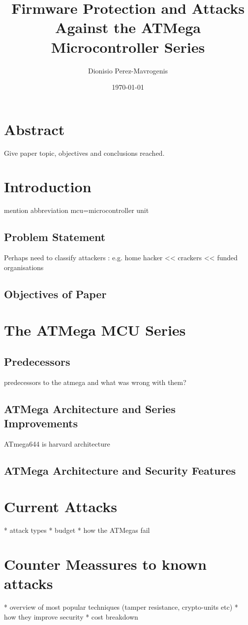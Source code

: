 \documentclass[12pt,a4paper,twocolumn]{article}
\author{Dionisio Perez-Mavrogenis}
\title{Firmware Protection and Attacks Against the ATMega Microcontroller Series}
\date{\today}
\begin{document}
	\maketitle
	
	\section*{Abstract}
	Give paper topic, objectives and conclusions reached.
	
	\section{Introduction}
	mention abbreviation mcu=microcontroller unit
	\subsection{Problem Statement}
	Perhaps need to classify attackers : e.g. home hacker << crackers << funded organisations 

	\subsection{Objectives of Paper}
	
	\section{The ATMega MCU Series}
	\subsection{Predecessors}
	predecessors to the atmega and what was wrong with them?
	\subsection{ATMega Architecture and Series Improvements}
	ATmega644 is harvard architecture \cite{atmega644_manual}
	
	\subsection{ATMega Architecture and Security Features}
	
	\section{Current Attacks}
	* attack types
	* budget
	* how the ATMegas fail

	\section{Counter Meassures to known attacks}
	* overview of most popular techniques (tamper resistance, crypto-units etc)
		* how they improve security		
		* cost breakdown
\end{document}
